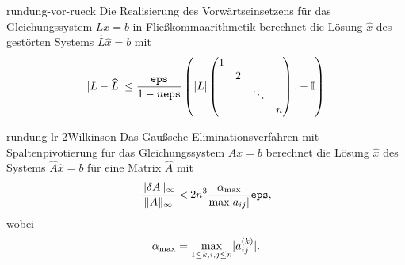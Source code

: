 
\begin{Lemma}{rundung-vor-rueck}
  Die Realisierung des Vorwärtseinsetzens für das Gleichungssystem
  $Lx = b$ in Fließkommaarithmetik berechnet die Lösung $\widehat x$ des
  gestörten Systems $\widehat L \widehat x = b$ mit
  \begin{gather}
    \lvert L - \widehat L\rvert
    \le \frac{\texttt{eps}}{1-n\texttt{eps}} \left(\lvert L\rvert
      \begin{pmatrix}
        1\\&2\\&&\ddots\\&&&n
      \end{pmatrix}
      .-\mathbb I \right)
  \end{gather}
\end{Lemma}


\begin{Satz*}{rundung-lr-2}{Wilkinson}
  Das Gaußsche Eliminationsverfahren mit Spaltenpivotierung für das
  Gleichungssystem $Ax=b$ berechnet die Lösung $\widehat x$ des Systems
  $\widehat A \widehat x = b$ für eine Matrix $\widehat A$ mit
  \begin{gather}
    \frac{\lVert\delta A\rVert_\infty}{\lVert A\rVert_\infty}
    \lessdot 2 n^3 \frac{\alpha_{\max}}{\max \lvert a_{ij}\rvert} \texttt{eps},
  \end{gather}
  wobei
  \begin{gather}
    \alpha_{\max} = \max_{1\le k,i,j\le n} \lvert a^{(k)}_{ij}\rvert.
  \end{gather}
\end{Satz*}

